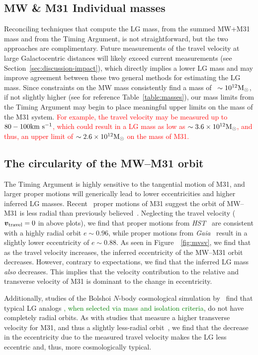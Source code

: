 \documentclass[twocolumn]{aastex631}
\newcommand{\remove}[1]{\textcolor{red}{#1}}
\newcommand{\add}[1]{\textcolor{green}{#1}}
\newcommand{\bov}{\ensuremath{\boldsymbol{v}}}
\newcommand{\vtrav}{\ensuremath{\bov_{\rm travel}}}
\begin{document}
\subsection{MW \& M31 Individual masses}
Reconciling techniques that compute the LG mass, from the summed MW+M31 mass and
from the Timing Argument, is not straightforward, but the two approaches
are complimentary.
Future measurements of the travel velocity at large Galactocentric distances
will likely exceed current measurements (see
Section~\ref{sec:discussion-impact}), which
directly implies a lower LG mass and may improve agreement between these two
general methods for estimating the LG mass.
Since constraints on the MW mass consistently find a mass of
~$\sim10^{12}\mathrm{M}_\odot$, if not slightly higher (see for reference
Table~\ref{table:masses}), our mass limits from the Timing Argument may begin to
place meaningful upper limits on the mass of the M31 system.
\remove{For example, the travel velocity may be measured up to $80-100\mathrm{km}~\mathrm{s}^{-1}$, which could
result in a LG mass as low as $\sim3.6\times10^{12}\mathrm{M}_\odot$, and thus, an upper
limit of $\sim2.6\times10^{12}\mathrm{M}_\odot$ on the mass of M31.}


\subsection{The circularity of the MW--M31 orbit}
The Timing Argument is highly sensitive to the tangential motion of M31, and
larger proper motions will generically lead to lower eccentricities and higher
inferred LG masses.
Recent \gaia\ proper motions of M31 suggest the orbit of MW--M31 is less radial
than previously believed~\citep{vdm2019,Salomon2021}.
Neglecting the travel velocity ($\vtrav=0$ in above plots), we find that proper
motions from \textit{HST}~\citep{vdm2012} are consistent with a highly radial
orbit $e\sim0.96$, while proper motions from \textit{Gaia}~\citep{Salomon2021}
result in a slightly lower eccentricity of $e\sim0.88$.
As seen in Figure~~\ref{fig:mvsv}, we find that as the travel velocity
increases, the inferred eccentricity of the MW--M31 orbit decreases.
However, contrary to expectations, we find that the inferred LG mass
\textit{also} decreases.
This implies that the velocity contribution to the relative and transverse
velocity of M31 is dominant to the change in eccentricity.

Additionally, studies of the Bolshoi $N$-body cosmological simulation
by~\cite{Forero-Romero2013} find that typical LG analogs
\add{, when selected via mass and isolation criteria},
do not have completely radial orbits.
As with studies that measure a higher transverse velocity for M31, and thus a
slightly less-radial orbit~\citep{vdm2019,Salomon2021}, we find that the
decrease in the eccentricity due to the measured travel velocity makes the LG
less eccentric and, thus, more cosmologically typical.
\end{document}
